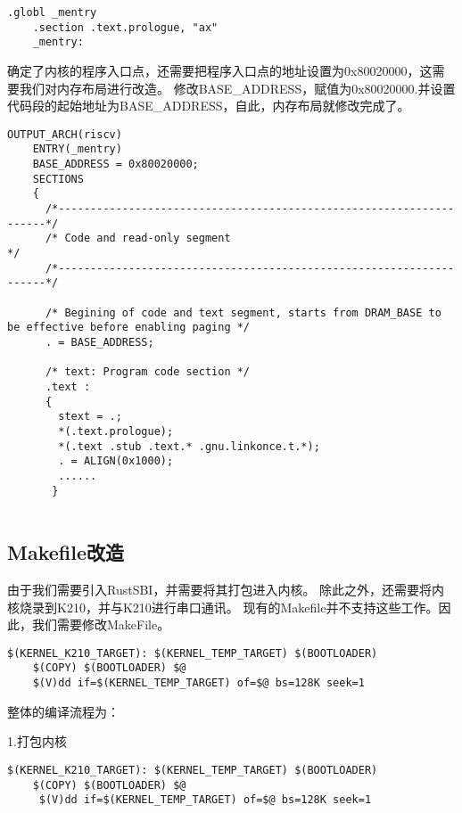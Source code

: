 \begin{lstlisting}[caption={修改内核程序入口点}, label={lst:change_kernel_entry}]
    .globl _mentry
    .section .text.prologue, "ax"
    _mentry:
\end{lstlisting}

确定了内核的程序入口点，还需要把程序入口点的地址设置为0x80020000，这需要我们对内存布局进行改造。
修改BASE\_ADDRESS，赋值为0x80020000.并设置代码段的起始地址为BASE\_ADDRESS，自此，内存布局就修改完成了。

\begin{lstlisting}[caption={修改内存布局}, label={lst:change_memory_layout}]
    OUTPUT_ARCH(riscv)
    ENTRY(_mentry)
    BASE_ADDRESS = 0x80020000;
    SECTIONS
    {
      /*--------------------------------------------------------------------*/
      /* Code and read-only segment                                         */
      /*--------------------------------------------------------------------*/
    
      /* Begining of code and text segment, starts from DRAM_BASE to be effective before enabling paging */
      . = BASE_ADDRESS;
      
      /* text: Program code section */
      .text : 
      {
        stext = .;
        *(.text.prologue);
        *(.text .stub .text.* .gnu.linkonce.t.*);
        . = ALIGN(0x1000);
        ......
       }
    
\end{lstlisting}

\subsection{Makefile改造}

由于我们需要引入RustSBI，并需要将其打包进入内核。
除此之外，还需要将内核烧录到K210，并与K210进行串口通讯。
现有的Makefile并不支持这些工作。因此，我们需要修改MakeFile。

\begin{lstlisting}[caption={修改Makefile}, label={lst:change_makefile}]
    $(KERNEL_K210_TARGET): $(KERNEL_TEMP_TARGET) $(BOOTLOADER)
    $(COPY) $(BOOTLOADER) $@
    $(V)dd if=$(KERNEL_TEMP_TARGET) of=$@ bs=128K seek=1
\end{lstlisting}

整体的编译流程为：

1.打包内核

\begin{lstlisting}[caption={打包内核}, label={lst:pack_kernel}]
    $(KERNEL_K210_TARGET): $(KERNEL_TEMP_TARGET) $(BOOTLOADER)
    $(COPY) $(BOOTLOADER) $@
     $(V)dd if=$(KERNEL_TEMP_TARGET) of=$@ bs=128K seek=1
\end{lstlisting}


